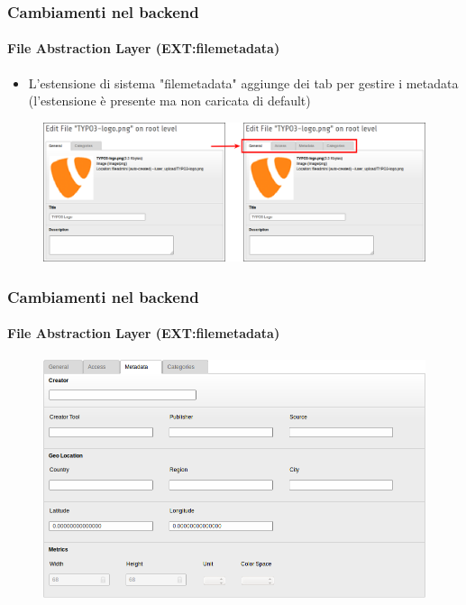 
\begin{frame}[fragile]
	\frametitle{Cambiamenti nel backend}
	\framesubtitle{File Abstraction Layer (EXT:filemetadata)}

	\begin{itemize}
		\item L'estensione di sistema "filemetadata" aggiunge dei tab per gestire i metadata
			\small(l'estensione è presente ma non caricata di default)\normalsize
	\end{itemize}

	\begin{figure}
		\includegraphics[width=0.95\linewidth]{Images/BackendChanges/FileMetaDataTabs.png}
	\end{figure}

\end{frame}


\begin{frame}[fragile]
	\frametitle{Cambiamenti nel backend}
	\framesubtitle{File Abstraction Layer (EXT:filemetadata)}

	\begin{figure}
		\includegraphics[width=0.8\linewidth]{Images/BackendChanges/FileMetaData.png}
	\end{figure}

\end{frame}

